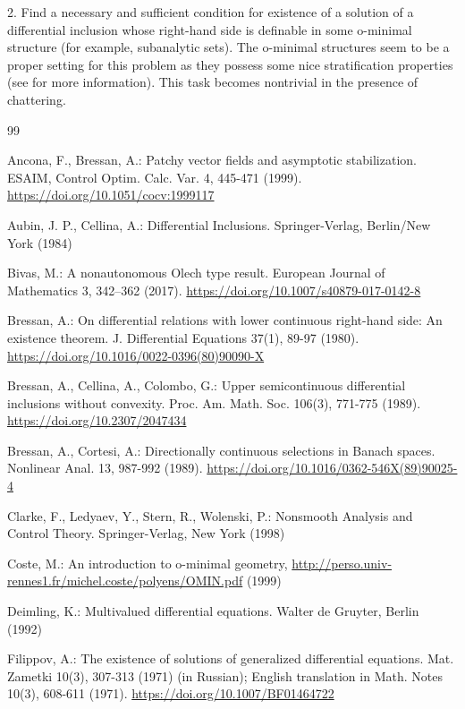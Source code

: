 \documentclass[a4paper]{article}
\begin{document}
2. Find a necessary and sufficient condition for existence of a solution of a differential inclusion whose right-hand side is definable in some o-minimal structure (for example, subanalytic sets). The o-minimal structures seem to be a proper setting for this problem as they possess some nice stratification properties (see \cite{Coste} for more information). This task becomes nontrivial in the presence of chattering.

\begin{thebibliography}{99}

 Ancona, F., Bressan, A.: Patchy vector fields and asymptotic stabilization. ESAIM, Control Optim. Calc. Var. 4, 445-471 (1999). \url{https://doi.org/10.1051/cocv:1999117}

 Aubin, J. P., Cellina, A.: Differential Inclusions. Springer-Verlag, Berlin/New York (1984)

 Bivas, M.: A nonautonomous Olech type result. European Journal of Mathematics 3, 342–362 (2017). \url{https://doi.org/10.1007/s40879-017-0142-8}

 Bressan, A.: On differential relations with lower continuous right-hand side: An existence theorem. J. Differential Equations 37(1), 89-97 (1980). \url{https://doi.org/10.1016/0022-0396(80)90090-X}

 Bressan, A., Cellina, A., Colombo, G.: Upper semicontinuous differential inclusions without convexity. Proc. Am. Math. Soc. 106(3), 771-775 (1989). \url{https://doi.org/10.2307/2047434}

 Bressan, A., Cortesi, A.: Directionally continuous selections in Banach spaces. Nonlinear Anal. 13, 987-992 (1989). \url{https://doi.org/10.1016/0362-546X(89)90025-4}

 Clarke, F., Ledyaev, Y., Stern, R., Wolenski, P.: Nonsmooth Analysis and Control Theory. Springer-Verlag, New York (1998)

 Coste, M.: An introduction to o-minimal geometry, \url{http://perso.univ-rennes1.fr/michel.coste/polyens/OMIN.pdf} (1999)

 Deimling, K.: Multivalued differential equations. Walter de Gruyter, Berlin (1992)

 Filippov, A.: The existence of solutions of generalized differential equations. Mat. Zametki 10(3), 307-313 (1971) (in Russian); English translation in Math. Notes 10(3), 608-611 (1971). \url{https://doi.org/10.1007/BF01464722}


\end{thebibliography}
\end{document}
